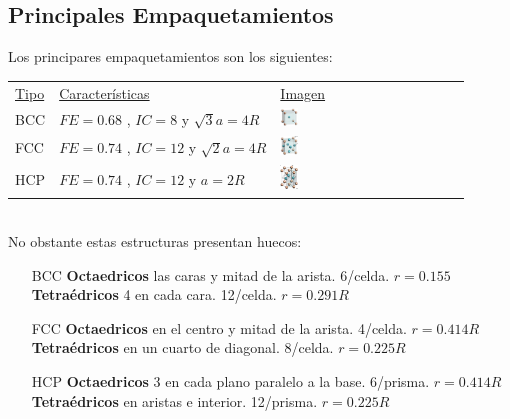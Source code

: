 \documentclass[12pt]{article}
\begin{document}
	\subsection{Principales Empaquetamientos}
Los principares empaquetamientos son los siguientes:
\begin{table}[h!]
\begin{tabular}{lll}
\underline{Tipo} & \underline{Características} & \underline{Imagen}                                     \\
BCC & $FE=0.68$ , $IC=8$ y $\sqrt{3}a=4R$& \includegraphics[width=0.1\textwidth]{BCC}                             \\
FCC & $FE=0.74$ , $IC=12$ y $\sqrt{2}a=4R$ & \includegraphics[width=0.1\textwidth]{FCC}                                                \\
HCP & $FE=0.74$ , $IC=12$ y $a=2R$ & \includegraphics[width=0.1\textwidth]{HCP}                            
\end{tabular}
\end{table} \\
No obstante estas estructuras presentan huecos:
\begin{itemize}
	\item[BCC] \textbf{Octaedricos} las caras y mitad de la arista. 6/celda. $r=0.155$ \\
	\textbf{Tetraédricos} 4 en cada cara. 12/celda. $r=0.291R$
	\item[FCC] \textbf{Octaedricos} en el centro y mitad de la arista. 4/celda. $r=0.414R$ \\
	\textbf{Tetraédricos} en un cuarto de diagonal. 8/celda. $r=0.225R$
	\item[HCP] \textbf{Octaedricos} 3 en cada plano paralelo a la base. 6/prisma. $r=0.414R$ \\
	\textbf{Tetraédricos} en aristas e interior. 12/prisma. $r=0.225R$
\end{itemize}
\end{document}
